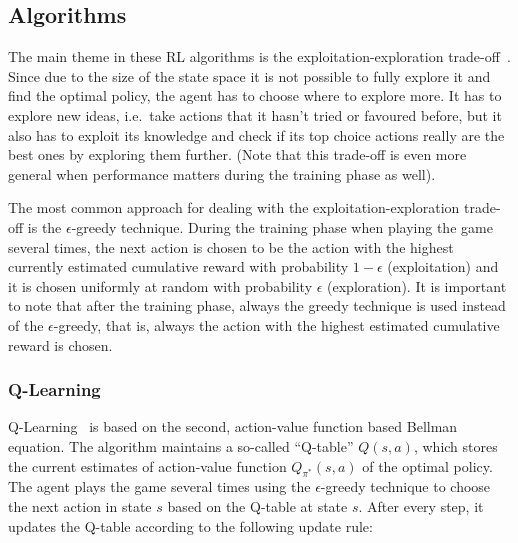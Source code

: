 \subsection{Algorithms}


The main theme in these RL algorithms is the exploitation-exploration trade-off~\cite{kaelbling1996explorationexploitation}. Since due to the size of the state space it is not possible to fully explore it and find the optimal policy, the agent has to choose where to explore more. It has to explore new ideas, i.e.\ take actions that it hasn't tried or favoured before, but it also has to exploit its knowledge and check if its top choice actions really are the best ones by exploring them further. (Note that this trade-off is even more general when performance matters during the training phase as well).

The most common approach for dealing with the exploitation-exploration trade-off is the $\epsilon$-greedy technique. During the training phase when playing the game several times, the next action is chosen to be the action with the highest currently estimated cumulative reward with probability $1-\epsilon$ (exploitation) and it is chosen uniformly at random with probability $\epsilon$ (exploration). It is important to note that after the training phase, always the greedy technique is used instead of the $\epsilon$-greedy, that is, always the action with the highest estimated cumulative reward is chosen.



\subsubsection{Q-Learning}


Q-Learning~\cite{watkins1989qlearning} is based on the second, action-value function based Bellman equation. The algorithm maintains a so-called ``Q-table'' $Q(s,a)$, which stores the current estimates of action-value function $Q_{\pi^*}(s,a)$ of the optimal policy. The agent plays the game several times using the $\epsilon$-greedy technique to choose the next action in state $s$ based on the Q-table at state $s$. After every step, it updates the Q-table according to the following update rule:

